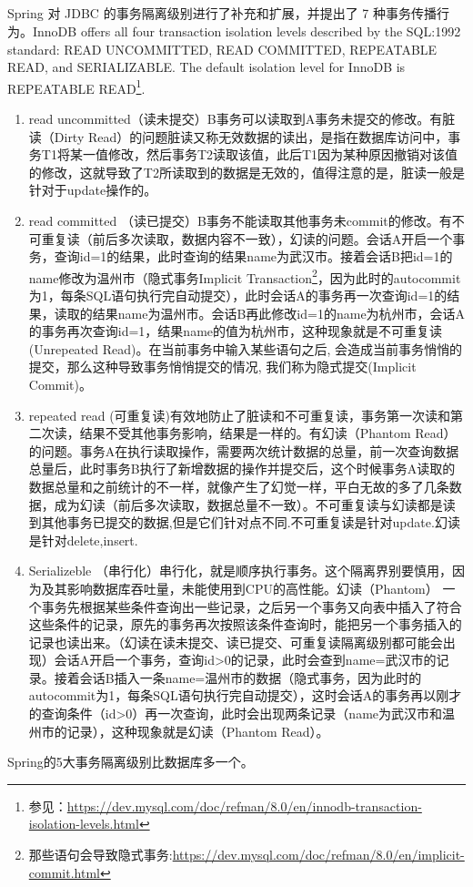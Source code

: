 \documentclass[../../../interview-questions.tex]{subfiles}
\begin{document}
\subsection{\color{red}{数据库事务的隔离级别(Database Transaction Isolation Levels)}}

Spring 对 JDBC 的事务隔离级别进行了补充和扩展，并提出了 7 种事务传播行为。InnoDB offers all four transaction isolation levels described by the SQL:1992 standard: READ UNCOMMITTED, READ COMMITTED, REPEATABLE READ, and SERIALIZABLE. The default isolation level for InnoDB is REPEATABLE READ\footnote{参见：\url{https://dev.mysql.com/doc/refman/8.0/en/innodb-transaction-isolation-levels.html}}.

\begin{enumerate}
\item {read uncommitted（读未提交）B事务可以读取到A事务未提交的修改。有脏读（Dirty Read）的问题}脏读又称无效数据的读出，是指在数据库访问中，事务T1将某一值修改，然后事务T2读取该值，此后T1因为某种原因撤销对该值的修改，这就导致了T2所读取到的数据是无效的，值得注意的是，脏读一般是针对于update操作的。
\item{read committed （读已提交）B事务不能读取其他事务未commit的修改。有不可重复读（前后多次读取，数据内容不一致），幻读的问题。}会话A开启一个事务，查询id=1的结果，此时查询的结果name为武汉市。接着会话B把id=1的name修改为温州市（隐式事务Implicit Transaction\footnote{那些语句会导致隐式事务:\url{https://dev.mysql.com/doc/refman/8.0/en/implicit-commit.html}}，因为此时的autocommit为1，每条SQL语句执行完自动提交），此时会话A的事务再一次查询id=1的结果，读取的结果name为温州市。会话B再此修改id=1的name为杭州市，会话A的事务再次查询id=1，结果name的值为杭州市，这种现象就是不可重复读(Unrepeated Read)。在当前事务中输入某些语句之后, 会造成当前事务悄悄的提交，那么这种导致事务悄悄提交的情况, 我们称为隐式提交(Implicit Commit)。
\item{repeated read (可重复读)有效地防止了脏读和不可重复读，事务第一次读和第二次读，结果不受其他事务影响，结果是一样的。有幻读（Phantom Read）的问题。事务A在执行读取操作，需要两次统计数据的总量，前一次查询数据总量后，此时事务B执行了新增数据的操作并提交后，这个时候事务A读取的数据总量和之前统计的不一样，就像产生了幻觉一样，平白无故的多了几条数据，成为幻读（前后多次读取，数据总量不一致）。不可重复读与幻读都是读到其他事务已提交的数据,但是它们针对点不同.不可重复读是针对update.幻读是针对delete,insert.}
\item{Serializeble （串行化）串行化，就是顺序执行事务。这个隔离界别要慎用，因为及其影响数据库吞吐量，未能使用到CPU的高性能。}幻读（Phantom）
一个事务先根据某些条件查询出一些记录，之后另一个事务又向表中插入了符合这些条件的记录，原先的事务再次按照该条件查询时，能把另一个事务插入的记录也读出来。（幻读在读未提交、读已提交、可重复读隔离级别都可能会出现）会话A开启一个事务，查询id>0的记录，此时会查到name=武汉市的记录。接着会话B插入一条name=温州市的数据（隐式事务，因为此时的autocommit为1，每条SQL语句执行完自动提交），这时会话A的事务再以刚才的查询条件（id>0）再一次查询，此时会出现两条记录（name为武汉市和温州市的记录），这种现象就是幻读（Phantom Read）。
\end{enumerate}

Spring的5大事务隔离级别比数据库多一个。
\end{document}

